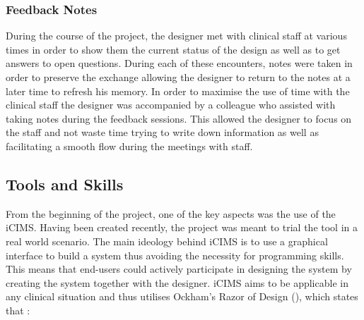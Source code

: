 \subsubsection{Feedback Notes}
During the course of the project, the designer met with clinical staff at various times in order to show them the current status of the design as well as to get answers to open questions. During each of these encounters, notes were taken in order to preserve the exchange allowing the designer to return to the notes at a later time to refresh his memory. In order to maximise the use of time with the clinical staff the designer was accompanied by a colleague who assisted with taking notes during the feedback sessions. This allowed the designer to focus on the staff and not waste time trying to write down information as well as facilitating a smooth flow during the meetings with staff.

\newpage
\subsection{Tools and Skills}
From the beginning of the project, one of the key aspects was the use of the \gls{iCIMS}.  Having been created recently, the project was meant to trial the tool in a real world scenario. The main ideology behind iCIMS is to use a graphical interface to build a system thus avoiding the necessity for programming skills. This means that end-users could actively participate in designing the system by creating the system together with the designer. iCIMS aims to be applicable in any clinical situation and thus utilises Ockham's Razor of Design (\cite{Budd}), which states that :

